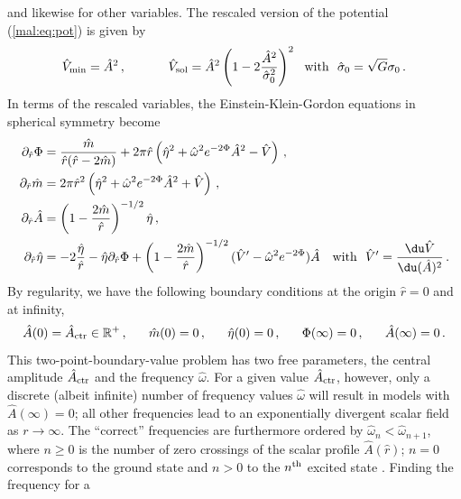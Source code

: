 %
and likewise for other variables. The rescaled version
of the potential (\ref{mal:eq:pot}) is given by
%
\begin{equation}
  \hat{V}_{\rm min} = \hat{A}^2\,,~~~~~~~~~~
  \hat{V}_{\rm sol} =
  \hat{A}^2
  \left(
  1-2\frac{\hat{A}^2}{\hat{\sigma}_0^2}
  \right)^2~~\text{with}~~\hat{\sigma}_0=\sqrt{G}\sigma_0\,.
  \label{mal:eq:potentials}
\end{equation}
%
In terms of the rescaled variables, the Einstein-Klein-Gordon
equations in spherical symmetry become
%
\begin{align}
  \partial_{\hat{r}}\Phi &=
  \frac{\hat{m}}{\hat{r}(\hat{r}-2\hat{m})}
  +
  2\pi \hat{r}
  \left(
  \hat{\eta}^2
  +\hat{\omega}^2e^{-2\Phi}\hat{A}^2
  -\hat{V}
  \right)\,, \label{mal:eq:Phir} \\
  \partial_{\hat{r}}\hat{m} &=
  2\pi \hat{r}^2
  \left(
  \hat{\eta}^2
  +\hat{\omega}^2e^{-2\Phi}\hat{A}^2
  +\hat{V}
  \right)\,,
  \\
  \partial_{\hat{r}}\hat{A} &=
  \left(
  1-\frac{2\hat{m}}{\hat{r}}
  \right)^{-1/2}
  \hat{\eta}\,, \\
  \partial_{\hat{r}} \hat{\eta} &=
  -2\frac{\hat{\eta}}{\hat{r}}
  -\hat{\eta}\partial_{\hat{r}}\Phi
  +\left(
  1-\frac{2\hat{m}}{\hat{r}}
  \right)^{-1/2}
  (\hat{V}'-\hat{\omega}^2e^{-2\Phi})\hat{A}~~~
  \text{with}~~
  \hat{V}'=\frac{\du \hat{V}}{\du (\hat{A})^2}\,.
  \label{mal:eq:etar}
\end{align}
%
By regularity, we have the following boundary conditions
at the origin $\hat{r}=0$ and at infinity,
%
\begin{equation}
  \hat{A}(0) = \hat{A}_{\rm ctr} \in \mathbb{R}^+\,,~~~~~
  \hat{m}(0) = 0\,,~~~~~
  \hat{\eta}(0) = 0\,,~~~~~
  \Phi(\infty) = 0\,,~~~~~
  \hat{A}(\infty) = 0\,.
\end{equation}
%
This two-point-boundary-value problem has two free
parameters, the central amplitude $\hat{A}_{\rm ctr}$ and the frequency
$\hat{\omega}$. For a given value $\hat{A}_{\rm ctr}$, however, only
a discrete (albeit infinite) number of frequency values
$\hat{\omega}$ will result in models with $\hat{A}(\infty)=0$;
all other frequencies lead to an exponentially divergent scalar
field as $r\rightarrow \infty$. The ``correct'' frequencies
are furthermore ordered by $\hat{\omega}_n<\hat{\omega}_{n+1}$,
where $n\ge 0$ is the number of zero crossings of the scalar
profile $\hat{A}(\hat{r})$; $n=0$ corresponds to the ground state
and $n>0$ to the $n^{\rm th}$ excited state
\cite{Balakrishna:1997ej}.
Finding the frequency for a
